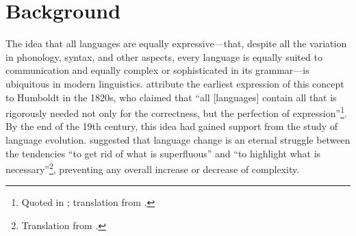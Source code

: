 \documentclass[12pt,twoside]{article}
\newcommand*{\tocref}[1]{\hyperref[{#1}]{\ref*{#1}.~\nameref*{#1}}}
\begin{document}

\section{Background}
\label{sec:bg}

The idea that all languages are equally expressive---that, despite all the variation in phonology, syntax, and other aspects, every language is equally suited to communication and equally complex or sophisticated in its grammar---is ubiquitous in modern linguistics. \citet{joseph} attribute the earliest expression of this concept to Humboldt in the 1820s, who claimed that ``all [languages] contain all that is rigorously needed not only for the correctness, but the perfection of expression''\footnote{Quoted in \cite[8]{rémusat}; translation from \cite[344]{joseph}.}. By the end of the 19th century, this idea had gained support from the study of language evolution. \citet[227]{passy} suggested that language change is an eternal struggle between the tendencies ``to get rid of what is superfluous'' and ``to highlight what is necessary''\footnote{Translation from \cite[352]{joseph}.}, preventing any overall increase or decrease of complexity.
\end{document}
